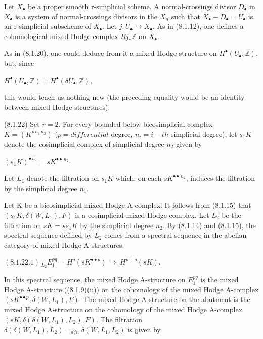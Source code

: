 \documentclass[11pt,twoside]{article}
\newcommand{\DFormula}[1]{%
  \par\smallskip\noindent\hspace*{0pt}\(\displaystyle #1\)\par\smallskip
}
\begin{document}
Let \(X_{\bullet }\) be a proper smooth r-simplicial scheme. A normal-crossings divisor \(D_{\bullet }\) in \(X_{\bullet }\) is a system of normal-crossings divisors in the \(X_{n}\) such that \(X_{\bullet }−D_{\bullet }=U_{\bullet }\) is an r-simplicial subscheme of \(X_{\bullet }\). Let \(j:U_{\bullet }\hookrightarrow X_{\bullet }\). As in (8.1.12), one defines a cohomological mixed Hodge complex \(Rj_{\ast }\mathbb{Z}\) on \(X_{\bullet }\).\par
\par\medskip
As in (8.1.20), one could deduce from it a mixed Hodge structure on \(H^{\bullet }(U_{\bullet },\mathbb{Z})\), but, since\par
\par\medskip
\DFormula{H^{\bullet }(U_{\bullet },\mathbb{Z})=H^{\bullet }(\delta U_{\bullet },\mathbb{Z}),}
\par\medskip
this would teach us nothing new (the preceding equality would be an identity between mixed Hodge structures).\par
\par\medskip
(8.1.22) Set \(r=2\). For every bounded-below bicosimplicial complex \(K=(K^{p\,n_{1}\,n_{2}})\) \((p=differential\) degree, \(n_{i}=i-th\) simplicial degree), let \(s_{1}K\) denote the cosimplicial complex of simplicial degree \(n_{2}\) given by\par
\par\medskip
\DFormula{(s_{1}K)^{\bullet \,n_{2}}=sK^{\bullet \bullet \,n_{2}}.}
\par\medskip
Let \(L_{1}\) denote the filtration on \(s_{1}K\) which, on each \(sK^{\bullet \bullet \,n_{2}}\), induces the filtration by the simplicial degree \(n_{1}\).\par
\par\medskip
Let K be a bicosimplicial mixed Hodge A-complex. It follows from (8.1.15) that \((s_{1}K,\delta (W,L_{1}),F)\) is a cosimplicial mixed Hodge complex. Let \(L_{2}\) be the filtration on \(sK=ss_{1}K\) by the simplicial degree \(n_{2}\). By (8.1.14) and (8.1.15), the spectral sequence defined by \(L_{2}\) comes from a spectral sequence in the abelian category of mixed Hodge A-structures:\par
\par\medskip
\DFormula{(8.1.22.1)\,_{L_{2}}E_{1}^{pq}=H^{q}(sK^{\bullet \bullet p})\,\Rightarrow \,H^{p+q}(sK).}
\par\medskip
In this spectral sequence, the mixed Hodge A-structure on \(E_{1}^{pq}\) is the mixed Hodge A-structure ((8.1.9)(ii)) on the cohomology of the mixed Hodge A-complex \((sK^{\bullet \bullet p},\delta (W,L_{1}),F)\). The mixed Hodge A-structure on the abutment is the mixed Hodge A-structure on the cohomology of the mixed Hodge A-complex \((sK,\delta (\delta (W,L_{1}),L_{2}),F)\). The filtration \(\delta (\delta (W,L_{1}),L_{2})=_{dfn}\delta (W,L_{1},L_{2})\) is given by\par
\end{document}
